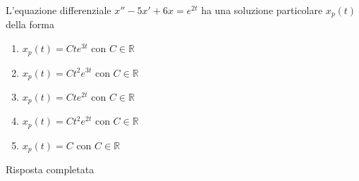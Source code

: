 \begin{quiz}
L'equazione differenziale $x''-5x'+6x=e^{2t}$ ha una soluzione particolare $x_p(t)$ della forma
\begin{enumerate}
\item $x_p(t)=Cte^{3t}$ con $C\in\mathbb R$
\item $x_p(t)=Ct^2e^{3t}$ con $C\in\mathbb R$
\item $x_p(t)=Cte^{2t}$ con $C\in\mathbb R$
\item $x_p(t)=Ct^2e^{2t}$ con $C\in\mathbb R$
\item $x_p(t)=C$ con $C\in\mathbb R$
\end{enumerate}
\end{quiz}
Risposta completata
